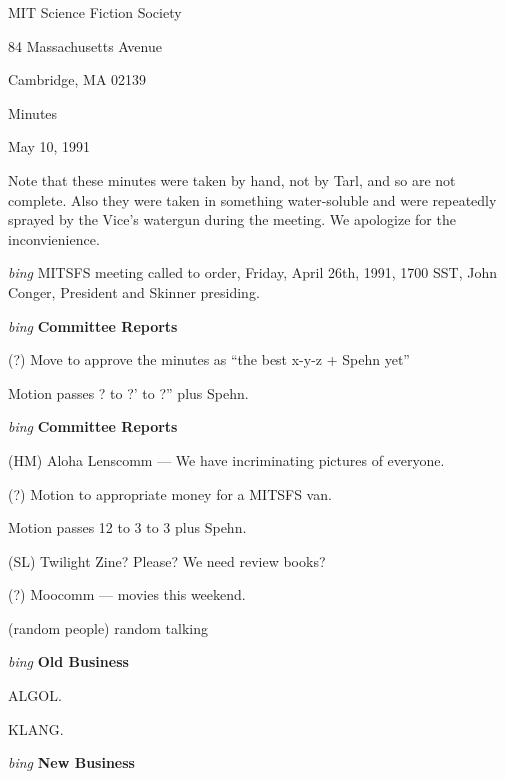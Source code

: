 \setlength{\topmargin}{-0.5in}
\setlength{\oddsidemargin}{0.0in}
\setlength{\evensidemargin}{0.0in}
\setlength{\textheight}{9in}
\setlength{\textwidth}{6.5in}



\begin{center}
MIT Science Fiction Society

84 Massachusetts Avenue

Cambridge, MA 02139

\vspace{0.2in}
Minutes

May 10, 1991

\end{center}
\vspace{0.15in}

Note that these minutes were taken by hand, not by Tarl, and so are not
complete.  Also they were taken in something water-soluble and were
repeatedly sprayed by the Vice's watergun during the meeting.  We
apologize for the inconvienience.

\vspace{0.15in}
{\em bing\/}  MITSFS meeting called to order, Friday, April 26th, 1991,
1700 SST, John Conger, President and Skinner presiding.

\vspace{0.15in}
{\em bing\/} {\bf Committee Reports\/}

(?) Move to approve the minutes as ``the best x-y-z + Spehn yet''

Motion passes ? to ?' to ?'' plus Spehn.

\vspace{0.15in}
{\em bing\/} {\bf Committee Reports\/}

(HM) Aloha Lenscomm --- We have incriminating pictures of everyone.

(?) Motion to appropriate money for a MITSFS van.

Motion passes 12 to 3 to 3 plus Spehn.

(SL) Twilight Zine?  Please?  We need review books?

(?) Moocomm --- movies this weekend.

(random people) random talking

\vspace{.15in}
{\em bing\/} {\bf Old Business\/}

ALGOL.

KLANG.

\vspace{0.15in}
{\em bing\/} {\bf New Business\/}

